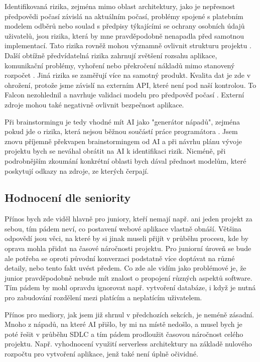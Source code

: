 \documentclass[FM,DP]{tulthesis}
\begin{document}
		Identifikovaná rizika, zejména mimo oblast architektury, jako je nepřesnost předpovědi počasí závislá na aktuálním počasí, problémy spojené s platebním modelem odběrů nebo soulad s předpisy týkajícími se ochrany osobních údajů uživatelů, jsou rizika, která by mne pravděpodobně nenapadla před samotnou implementací. Tato rizika rovněž mohou významně ovlivnit strukturu projektu \cite{chatgpt_analyza}. Další obtížně předvídatelná rizika zahrnují zvětšení rozsahu aplikace, komunikační problémy, vyhoření nebo překročení nákladů mimo stanovený rozpočet \cite{claude_analyza} \cite{bard_analyza}. Jiná rizika se zaměřují více na samotný produkt. Kvalita dat je zde v ohrožení, protože jsme závislí na externím API, které není pod naší kontrolou. To Falcon nezohlednil a navrhuje validaci modelu pro předpověď počasí \cite{falcon_analyza}. Externí zdroje mohou také negativně ovlivnit bezpečnost aplikace. 
		
		Při brainstormingu je tedy vhodné mít AI jako "generátor nápadů", zejména pokud jde o rizika, která nejsou běžnou součástí práce programátora \cite{falcon_analyza} \cite{claude_analyza} \cite{codellama_analyza}. Jsem znovu příjemně překvapen brainstormingem od AI a při návrhu plánu vývoje projektu bych se neváhal obrátit na AI k identifikaci rizik. Nicméně, při podrobnějším zkoumání konkrétní oblasti bych dával přednost modelům, které poskytují odkazy na zdroje, ze kterých čerpají.
		
		\subsection{Hodnocení dle seniority}
		Přínos bych zde viděl hlavně pro juniory, kteří nemají např. ani jeden projekt za sebou, tím pádem neví, co postavení webové aplikace vlastně obnáší. Většina odpovědí jsou věci, na které by si jinak museli přijít v průběhu procesu, kde by oprava mohla přidat na časové náročnosti projektu. Pro juniorní úroveň se bude ale potřeba se oproti původní konverzaci podstatně více doptávat na různé detaily, nebo tento fakt uvést předem. Co zde ale vidím jako problémové je, že junior pravděpodobně nebude mít znalost o propojení různých aspektů software. Tím pádem by mohl opravdu ignorovat např. vytvoření databáze, i když je nutná pro zabudování rozdělení mezi platícím a neplatícím uživatelem.
		
		Přínos pro mediory, jak jsem již shrnul v předchozích sekcích, je neméně zásadní. Mnoho z nápadů, na které AI přišlo, by mi na místě nedošlo, a musel bych je poté řešit v průběhu SDLC a tím pádem prodloužit časovou náročnost celého projektu. Např. vyhodnocení využití serverless architektury na základě nulového rozpočtu pro vytvoření aplikace, jenž také není úplně očividné. 
		
\end{document}
